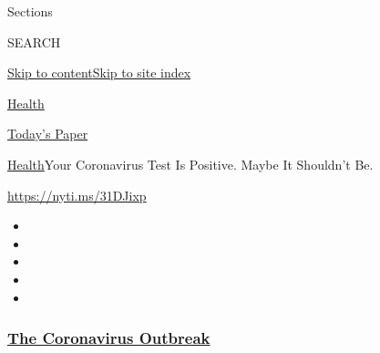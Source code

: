 Sections

SEARCH

\protect\hyperlink{site-content}{Skip to
content}\protect\hyperlink{site-index}{Skip to site index}

\href{https://www.nytimes3xbfgragh.onion/section/health}{Health}

\href{https://myaccount.nytimes3xbfgragh.onion/auth/login?response_type=cookie\&client_id=vi}{}

\href{https://www.nytimes3xbfgragh.onion/section/todayspaper}{Today's
Paper}

\href{/section/health}{Health}\textbar{}Your Coronavirus Test Is
Positive. Maybe It Shouldn't Be.

\url{https://nyti.ms/31DJixp}

\begin{itemize}
\item
\item
\item
\item
\item
\end{itemize}

\hypertarget{the-coronavirus-outbreak}{%
\subsubsection{\texorpdfstring{\href{https://www.nytimes3xbfgragh.onion/news-event/coronavirus?name=styln-coronavirus-national\&region=TOP_BANNER\&block=storyline_menu_recirc\&action=click\&pgtype=Article\&impression_id=5b626190-f4ba-11ea-8f75-57b78e238649\&variant=undefined}{The
Coronavirus
Outbreak}}{The Coronavirus Outbreak}}\label{the-coronavirus-outbreak}}

